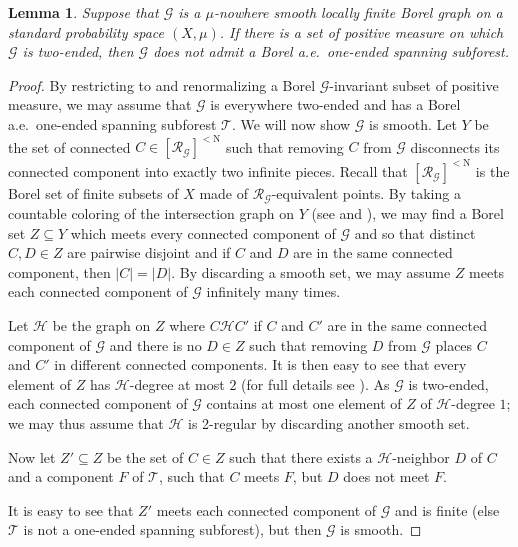 \documentclass[11pt]{amsart}
\theoremstyle{definition}
\theoremstyle{plain}
\newtheorem{lemma}[definition]{Lemma}
\newcommand{\<}{\langle}
\renewcommand{\>}{\rangle}
\newcommand{\N}{\bm{\mathrm{N}}}
\newcommand{\Ggraph}{\mathcal{G}}
\newcommand{\Hgraph}{\mathcal{H}}
\newcommand{\Tgraph}{\mathcal{T}}
\newcommand\RR{\mathscr{R}}
\begin{document}
\begin{lemma}\label{lem:obstruct}
  Suppose that ${\Ggraph}$ is a $\mu$-nowhere smooth locally finite Borel graph on a
  standard probability space $(X,\mu)$. If there
  is a set of positive measure on which ${\Ggraph}$ is two-ended, then ${\Ggraph}$ does not
  admit a Borel a.e.\ one-ended spanning subforest.
\end{lemma}
\begin{proof}
  By restricting to and renormalizing a Borel ${\Ggraph}$-invariant subset of positive
  measure, we may assume
  that ${\Ggraph}$ is everywhere two-ended and has a Borel a.e.\ one-ended spanning
  subforest ${\Tgraph}$. We will now show ${\Ggraph}$ is smooth. Let $Y$ be the set of
  connected $C \in
  [\RR_{\Ggraph}]^{<\N}$ such that removing $C$ from ${\Ggraph}$ disconnects its connected
  component into exactly two infinite pieces. Recall that $ [\RR_{\Ggraph}]^{<\N}$ is the Borel set of finite subsets of $X$ made of $\RR_{\Ggraph}$-equivalent points.
  By taking a countable
  coloring of the intersection graph on $Y$ (see {\cite[Lemma 7.3]{KM04}} and
  {\cite[Proposition 2]{CM16}}), we may find a Borel set $Z
  \subseteq Y$ which meets every connected component of ${\Ggraph}$ and so that
  distinct $C,D \in Z$ are pairwise disjoint and if $C$ and $D$ are in
  the same connected component, then $|C| = |D|$. By discarding a smooth
  set, we may assume $Z$ meets each connected component of ${\Ggraph}$ infinitely
  many times.

  Let ${\Hgraph}$ be the graph on $Z$ where $C \mathrel{{\Hgraph}} C'$ if $C$
  and $C'$ are in the same connected component of ${\Ggraph}$ and there is no $D
  \in Z$ such that removing $D$ from ${\Ggraph}$ places $C$ and $C'$ in different
  connected components. 
  It is then easy to see that every element of $Z$ has ${\Hgraph}$-degree at most $2$ (for full details see {\cite[Sublemma 5.7]{Mil09}}).  
  As ${\Ggraph}$ is two-ended, each connected component of ${\Ggraph}$ contains at most one element of $Z$ of ${\Hgraph}$-degree $1$; we may thus assume that ${\Hgraph}$ is 2-regular by discarding another smooth set.


  Now let $Z' \subseteq Z$ be the set of $C \in Z$ such that there exists a $\Hgraph$-neighbor $D$ of $C$ and a component $F$ of $\Tgraph$, such that $C$ meets $F$, but $D$ does not meet $F$.

  It is easy to see that $Z'$ meets each connected component
  of ${\Ggraph}$ and is finite (else ${\Tgraph}$ is not a one-ended spanning subforest),
  but then ${\Ggraph}$ is smooth.
\end{proof}
\end{document}
